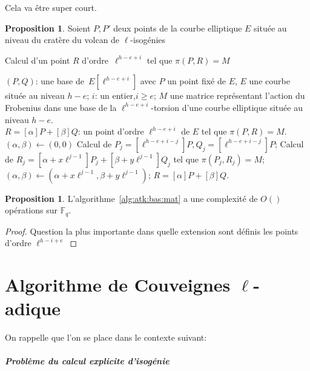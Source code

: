 \documentclass[10pt,a4paper]{book}
\theoremstyle{plain}
\theoremstyle{definition}
\theoremstyle{definition}
\theoremstyle{definition}
\newtheorem{prop}[thm]{Proposition}
\theoremstyle{definition}
\theoremstyle{remark}
\theoremstyle{remark}
\theoremstyle{definition}
\begin{document}
Cela va être super court.

\begin{prop}
Soient $P,P'$ deux points de la courbe elliptique $E$ située au niveau du 
cratère du volcan de $\ell$-isogénies
\end{prop}

\begin{algorithm}
\caption{\label{alg:atk:bas:mat}Calcul d'un point $R$ d'ordre~$\ell^{h-e+i}$ tel que $\pi(P,R)=M$}
\begin{algorithmic}[1]
\REQUIRE $(P, Q)$: une base de~$E[\ell^{h-e+i}]$ avec $P$ un point fixé de $E$, $E$ une courbe située au niveau $h-e$; $i$: un entier,$i \geqslant e$; $M$ une matrice représentant l'action du Frobenius dans une base de la $\ell^{h-e+i}$-torsion d'une courbe elliptique située au niveau $h-e$.\\
\ENSURE $R=[\alpha]P+ [\beta]Q $: un point d'ordre $\ell^{h-e+i}$ de $E$ tel que $\pi(P,R)=M$.
\STATE $(\alpha, \beta ) \leftarrow (0,0)$
\STATE Calcul de $P_j=[\ell^{h-e+i-j}]P, Q_j=[\ell^{h-e+i-j}]P$;
\STATE Calcul de $R_j=[\alpha + x\ell^{j-1}]P_j+ [\beta +y\ell^{j-1}]Q_j$ tel que $\pi(P_j,R_j)=M$;
\STATE $(\alpha, \beta) \leftarrow (\alpha + x\ell^{j-1}, \beta +y\ell^{j-1})$;
\ENDFOR
\RETURN\label{alg:atk:horizontal:final} $R =[\alpha]P+ [\beta]Q$. 
\end{algorithmic}
\end{algorithm}

\begin{prop}
L'algorithme~\ref{alg:atk:bas:mat} a une complexité de $O()$ opérations sur $\mathbb{F}_q$.
\end{prop}

\begin{proof}
Question la plus importante dans quelle extension sont définis les points d'ordre $\ell^{h-i+e}$
\end{proof}

\chapter{Algorithme de Couveignes $\ell$-adique}
\label{cha:alg:fin}
On rappelle que l'on se place dans le contexte suivant:

\paragraph{Problème du calcul explicite d'isogénie} \label{prob:isogeny-problem}
\end{document}
